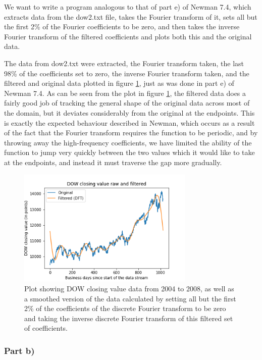 \documentclass{article}
\begin{document}
We want to write a program analogous to that of part e) of Newman 7.4, which extracts data from the dow2.txt file, takes the Fourier transform of it, sets all but the first 2\% of the Fourier coefficients to be zero, and then takes the inverse Fourier transform of the filtered coefficients and plots both this and the original data.

The data from dow2.txt were extracted, the Fourier transform taken, the last 98\% of the coefficients set to zero, the inverse Fourier transform taken, and the filtered and original data plotted in figure \ref{fig:1c_dft}, just as was done in part e) of Newman 7.4. As can be seen from the plot in figure \ref{fig:1c_dft}, the filtered data does a fairly good job of tracking the general shape of the original data across most of the domain, but it deviates considerably from the original at the endpoints. This is exactly the expected behaviour described in Newman, which occurs as a result of the fact that the Fourier transform requires the function to be periodic, and by throwing away the high-frequency coefficients, we have limited the ability of the function to jump very quickly between the two values which it would like to take at the endpoints, and instead it must traverse the gap more gradually.

\begin{figure}[H]
	\centering
	\includegraphics[width=0.75\textwidth]{../images/1c_dft.png}
	\caption{Plot showing DOW closing value data from 2004 to 2008, as well as a smoothed version of the data calculated by setting all but the first 2\% of the coefficients of the discrete Fourier transform to be zero and taking the inverse discrete Fourier transform of this filtered set of coefficients.}
	\label{fig:1c_dft}
\end{figure}

\subsubsection{Part b)}
\end{document}
